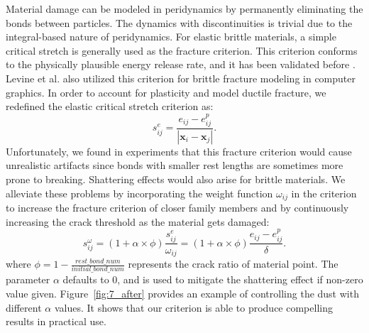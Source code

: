 Material damage can be modeled in peridynamics by permanently eliminating the bonds between particles. The dynamics with discontinuities is trivial due to the integral-based nature of peridynamics. For elastic brittle materials, a simple critical stretch is generally used as the fracture criterion. This criterion conforms to the physically plausible energy release rate, and it has been validated before \cite{Silling2005}. Levine et al.\cite{Levine:2015:PPS:2849517.2849526} also utilized this criterion for brittle fracture modeling in computer graphics. In order to account for plasticity and model ductile fracture, we redefined the elastic critical stretch criterion as:
\begin{equation}
s_{ij}^e =\frac{e_{ij}-e_{ij}^p}{|\mathbf{x}_i-\mathbf{x}_j|}.
\label{eq:17}
\end{equation}
Unfortunately, we found in experiments that this fracture criterion would cause unrealistic artifacts since bonds with smaller rest lengths are sometimes more prone to breaking. 
Shattering effects would also arise for brittle materials.
We alleviate these problems by incorporating the weight function $\omega_{ij}$ in the criterion to increase the fracture criterion of closer family members  
and by continuously increasing the crack threshold as the material gets damaged:
\begin{equation}
s_{ij}^\omega = (1 + \alpha\times\phi)\frac{s_{ij}^e}{\omega_{ij}} = (1 + \alpha\times\phi)\frac{e_{ij}-e_{ij}^p}{\delta}.
\label{eq:18}
\end{equation}
where $\phi = 1 - \frac{rest\_bond\_num}{initial\_bond\_num}$ represents the crack ratio of material point.
The parameter $\alpha$ defaults to 0, and is used to mitigate the shattering effect if non-zero value given.
Figure~\ref{fig:7_after} provides an example of controlling the dust with different $\alpha$ values.
It shows that our criterion is able to produce compelling results in practical use.

